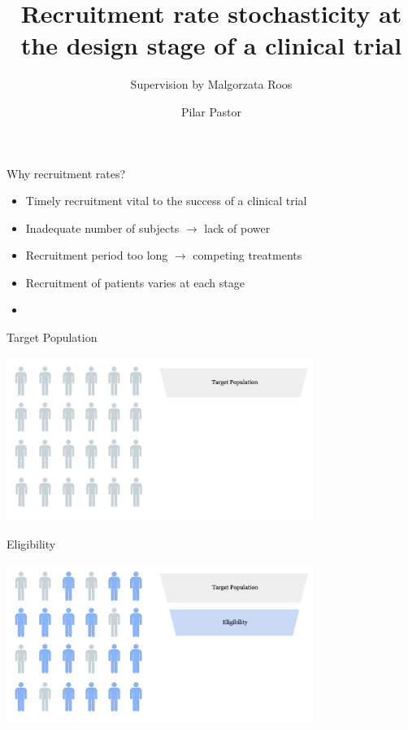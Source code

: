 \documentclass[english]{beamer}\usepackage[]{graphicx}\usepackage[]{xcolor}
\title[Recruitment rate stochasticity at the design
stage of a clinical trial]{Recruitment rate stochasticity at the design
stage of a clinical trial}
\subtitle{Supervision by Malgorzata Roos}
\author{Pilar Pastor}
\begin{document}
\maketitle


\begin{frame}{Why recruitment rates?}

\begin{itemize}
\item Timely recruitment vital to the success of a clinical trial
\item Inadequate number of subjects $\rightarrow$ lack of power
\item Recruitment period too long $\rightarrow$ competing treatments
\item Recruitment of patients varies at each stage 
\item \cite{carter2004application}
\end{itemize}


\end{frame}


\begin{frame}{Target Population}

\includegraphics[width=100mm,scale=1]{targetpop.png}

\end{frame}

\begin{frame}{Eligibility}

\includegraphics[width=100mm,scale=1]{eligibility.png}

\end{frame}
\end{document}
